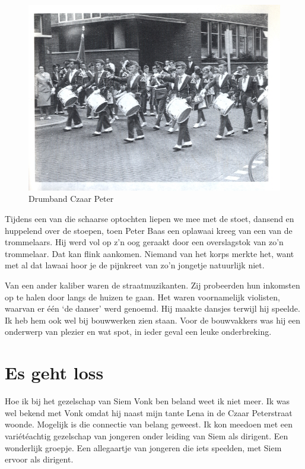 \documentclass[10pt,twoside, openright]{memoir}
\begin{document}
\begin{figure}
\includegraphics[width=\textwidth]{img/131CzPeter3.jpg}
\caption*{\footnotesize Drumband Czaar Peter}
\end{figure}

Tijdens een van die schaarse optochten liepen we mee met de stoet, dansend en huppelend over de stoepen, toen Peter Baas een oplawaai kreeg van een van de trommelaars. Hij werd vol op z’n oog geraakt door een overslagstok van zo’n trommelaar. 
Dat kan flink aankomen. Niemand van het korps merkte het, want met al dat lawaai hoor je de pijnkreet van zo’n jongetje natuurlijk niet.

Van een ander kaliber waren de straatmuzikanten. Zij probeerden hun inkomsten op te halen door langs de huizen te gaan. Het waren voornamelijk violisten, waarvan er één ‘de danser’ werd genoemd. Hij maakte dansjes terwijl hij speelde. Ik heb hem ook wel bij bouwwerken zien staan. Voor de bouwvakkers was hij een onderwerp van plezier en wat spot, in ieder geval een leuke onderbreking.


\section{Es geht loss} %
\label{cha:gehtloss}

Hoe ik bij het gezelschap van Siem Vonk ben beland weet ik niet meer. Ik was wel bekend met Vonk omdat hij naast mijn tante Lena in de Czaar Peterstraat woonde. Mogelijk is die connectie van belang geweest. Ik kon meedoen met een variétéachtig gezelschap van jongeren onder leiding van Siem als dirigent. Een wonderlijk groepje. Een allegaartje van jongeren die iets speelden, met Siem ervoor als dirigent.
\end{document}
